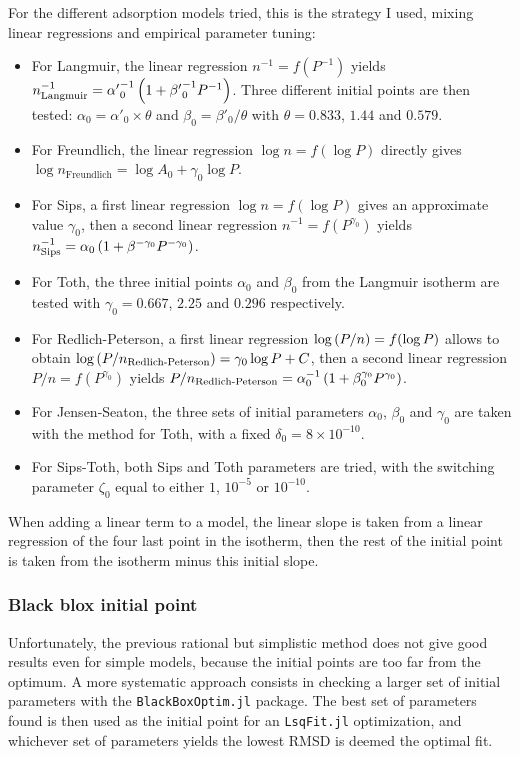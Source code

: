 \documentclass[main.tex]{subfiles}
\begin{document}
For the different adsorption models tried, this is the strategy I used, mixing linear regressions and empirical parameter tuning:
\begin{itemize}
	\item For Langmuir, the linear regression $n^{-1} = f(P^{-1})$
	 yields $n_\text{Langmuir}^{-1} = {\alpha'}_0^{-1}\left(1 + {\beta'}_0^{-1}P^{-1}\right)$. 
	 Three different initial points are then tested: $\alpha_0 = \alpha'_0\times\theta$
	  and $\beta_0 = \beta'_0/\theta$ 
	  with $\theta = 0.833$, $1.44$ and $0.579$.
	\item For Freundlich, the linear regression $\log n = f(\log P)$ directly gives $\log n_\text{Freundlich} = \log A_0 + \gamma_0\log P$.
	\item For Sips, a first linear regression $\log n = f(\log P)$ gives an approximate value $\gamma_0$, then a second linear regression $n^{-1} = f(P^{\gamma_0})$ yields $n_\text{Sips}^{-1} = \alpha_0\left(1 + \beta^{-\gamma_0}P^{-\gamma_0}\right)$.
	\item For Toth, the three initial points $\alpha_0$ and $\beta_0$ from the Langmuir isotherm are tested with $\gamma_0 = 0.667$, $2.25$ and $0.296$ respectively.
	\item For Redlich-Peterson, a first linear regression $\log\left(P/n\right) = f(\log P)$ allows to obtain $\log\left(P/n_\text{Redlich-Peterson}\right) = \gamma_0\log P + C$, then a second linear regression $P/n = f(P^{\gamma_0})$ yields $P/n_\text{Redlich-Peterson} = \alpha_0^{-1}\left(1 + \beta_0^{\gamma_0}P^{\gamma_0}\right)$.
	\item For Jensen-Seaton, the three sets of initial parameters $\alpha_0$, $\beta_0$ and $\gamma_0$ are taken with the method for Toth, with a fixed $\delta_0 = 8\times10^{-10}$.
	\item For Sips-Toth, both Sips and Toth parameters are tried, with the switching parameter $\zeta_0$ equal to either $1$, $10^{-5}$ or $10^{-10}$.
\end{itemize}

When adding a linear term to a model, the linear slope is taken from a linear regression of the four last point in the isotherm, then the rest of the initial point is taken from the isotherm minus this initial slope.

\subsubsection{Black blox initial point}

Unfortunately, the previous rational but simplistic method does not give good results even for simple models, because the initial points are too far from the optimum. A more systematic approach consists in checking a larger set of initial parameters with the \texttt{BlackBoxOptim.jl} package. The best set of parameters found is then used as the initial point for an \texttt{LsqFit.jl} optimization, and whichever set of parameters yields the lowest RMSD is deemed the optimal fit.
\end{document}
